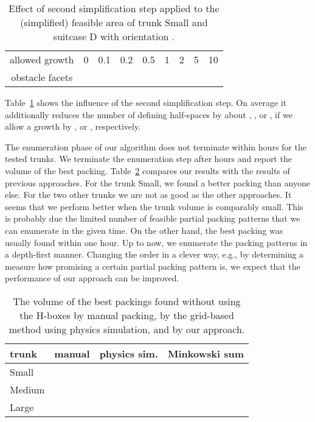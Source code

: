 \documentclass{article}
\newcounter{algo}
\newcommand{\TSmall}{{\sc Small}}
\newcommand{\TMedium}{{\sc Medium}}
\newcommand{\TLarge}{{\sc Large}}
\begin{document}
\begin{table}[t]
\center
\begin{tabular} {|c|cccccccc|}
\hline
allowed growth  & 0 & 0.1 & 0.2 & 0.5 & 1 & 2 & 5 & 10 \\ 
obstacle facets &  &  &  &  &  &  &  &  \\
\hline
\end{tabular}
\vspace{1mm}
\caption{ \label{table:secondSimplificationStep} Effect of second
simplification step applied to the (simplified) feasible area of trunk
{\TSmall} and suitcase D with orientation .}
\end{table}

Table~\ref{table:secondSimplificationStep} shows the influence of the
second simplification step. On average it additionally reduces the
number of defining half-spaces by about , , or , if
we allow a growth by ,  or , respectively. 

The enumeration phase of our algorithm does not terminate within 
hours for the tested trunks. We terminate the enumeration step after
 hours and report the volume of the best
packing. Table~\ref{table:quality} compares our results with the
results of previous approaches. For the trunk {\TSmall}, we found a
better packing than anyone else. For the two other trunks we are not
as good as the other approaches. It seems that we perform better when
the trunk volume is comparably small. This is probably due the limited
number of feasible partial packing patterns that we can enumerate in
the given time. On the other hand, the best packing was usually found
within one hour. Up to now, we enumerate the packing patterns in a
depth-first manner. Changing the order in a clever way, e.g., by
determining a measure how promising a certain partial packing pattern
is, we expect that the performance of our approach can be improved.

\begin{table}[t]
\begin{center}
\begin{tabular}{|l|r|r|r|}
\hline
trunk & manual & physics sim. & Minkowski sum \\
\hline
\TSmall  &  &  & \\
\TMedium &  &  & \\
\TLarge  &  &  & \\
\hline
\end{tabular}
\vspace{3mm}
\caption{The volume of the best packings found without using
the H-boxes by manual packing, by the grid-based method using physics
simulation, and by our approach.}
\label{table:quality}
\end{center}
\end{table}
\end{document}
